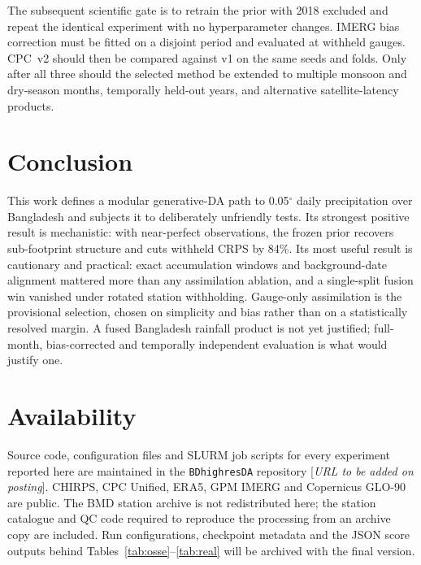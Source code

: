 \documentclass[10pt,twocolumn]{article}
\begin{document}
The subsequent scientific gate is to retrain the prior with 2018 excluded and
repeat the identical experiment with no hyperparameter changes. IMERG bias
correction must be fitted on a disjoint period and evaluated at withheld
gauges. CPC~v2 should then be compared against v1 on the same seeds and folds.
Only after all three should the selected method be extended to multiple monsoon
and dry-season months, temporally held-out years, and alternative
satellite-latency products.

\section{Conclusion}

This work defines a modular generative-DA path to 0.05$^\circ$ daily
precipitation over Bangladesh and subjects it to deliberately unfriendly tests.
Its strongest positive result is mechanistic: with near-perfect observations,
the frozen prior recovers sub-footprint structure and cuts withheld CRPS by
84\%. Its most useful result is cautionary and practical: exact accumulation
windows and background-date alignment mattered more than any assimilation
ablation, and a single-split fusion win vanished under rotated station
withholding. Gauge-only assimilation is the provisional selection, chosen on
simplicity and bias rather than on a statistically resolved margin. A fused
Bangladesh rainfall product is not yet justified; full-month, bias-corrected
and temporally independent evaluation is what would justify one.

\section*{Availability}

Source code, configuration files and SLURM job scripts for every experiment
reported here are maintained in the \texttt{BDhighresDA} repository
[\emph{URL to be added on posting}]. CHIRPS, CPC Unified, ERA5, GPM IMERG and
Copernicus GLO-90 are public. The BMD station archive is not redistributed
here; the station catalogue and QC code required to reproduce the processing
from an archive copy are included. Run configurations, checkpoint metadata and
the JSON score outputs behind Tables~\ref{tab:osse}--\ref{tab:real} will be
archived with the final version.
\end{document}
